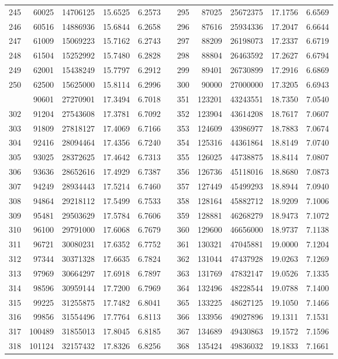 \begin{longtable}{rrrrrrrrrrr}
245&60025&14706125&15.6525&6.2573&&295&87025&25672375&17.1756&6.6569\\
246&60516&14886936&15.6844&6.2658&&296&87616&25934336&17.2047&6.6644\\
247&61009&15069223&15.7162&6.2743&&297&88209&26198073&17.2337&6.6719\\
248&61504&15252992&15.7480&6.2828&&298&88804&26463592&17.2627&6.6794\\
249&62001&15438249&15.7797&6.2912&&299&89401&26730899&17.2916&6.6869\\
250&62500&15625000&15.8114&6.2996&&300&90000&27000000&17.3205&6.6943\\
\newpage
301&90601&27270901&17.3494&6.7018&&351&123201&43243551&18.7350&7.0540\\
302&91204&27543608&17.3781&6.7092&&352&123904&43614208&18.7617&7.0607\\
303&91809&27818127&17.4069&6.7166&&353&124609&43986977&18.7883&7.0674\\
304&92416&28094464&17.4356&6.7240&&354&125316&44361864&18.8149&7.0740\\
305&93025&28372625&17.4642&6.7313&&355&126025&44738875&18.8414&7.0807\\
306&93636&28652616&17.4929&6.7387&&356&126736&45118016&18.8680&7.0873\\
307&94249&28934443&17.5214&6.7460&&357&127449&45499293&18.8944&7.0940\\
308&94864&29218112&17.5499&6.7533&&358&128164&45882712&18.9209&7.1006\\
309&95481&29503629&17.5784&6.7606&&359&128881&46268279&18.9473&7.1072\\
310&96100&29791000&17.6068&6.7679&&360&129600&46656000&18.9737&7.1138\\
311&96721&30080231&17.6352&6.7752&&361&130321&47045881&19.0000&7.1204\\
312&97344&30371328&17.6635&6.7824&&362&131044&47437928&19.0263&7.1269\\
313&97969&30664297&17.6918&6.7897&&363&131769&47832147&19.0526&7.1335\\
314&98596&30959144&17.7200&6.7969&&364&132496&48228544&19.0788&7.1400\\
315&99225&31255875&17.7482&6.8041&&365&133225&48627125&19.1050&7.1466\\
316&99856&31554496&17.7764&6.8113&&366&133956&49027896&19.1311&7.1531\\
317&100489&31855013&17.8045&6.8185&&367&134689&49430863&19.1572&7.1596\\
318&101124&32157432&17.8326&6.8256&&368&135424&49836032&19.1833&7.1661\\

\end{longtable}
